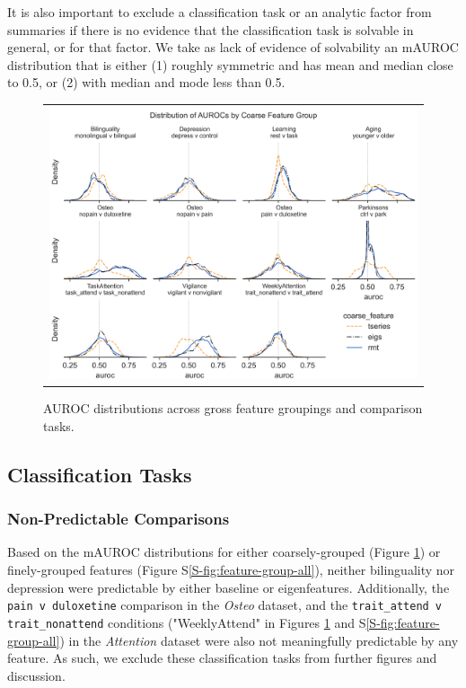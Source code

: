\documentclass[12pt]{spieman}  %
\newcommand{\code}[1]{\small \texttt{#1} \normalsize}
\begin{document}
\begin{spacing}{2}
It is also important to exclude a classification task or an analytic factor
from summaries if there is no evidence that the classification task is solvable
in general, or for that factor. We take as lack of evidence of solvability an
mAUROC distribution that is either (1) roughly symmetric and has mean and
median close to 0.5, or (2) with median and mode less than 0.5.

\begin{figure}
\begin{center}
\begin{tabular}{c}
\includegraphics[width=6.5in]{coarse_feature_overall_by_subgroup.png}
\end{tabular}
\end{center}
\caption
{ \label{fig:main-results}
AUROC distributions across gross feature groupings and comparison tasks.}
\end{figure}

\subsection{Classification Tasks}

\subsubsection{Non-Predictable Comparisons}
Based on the mAUROC distributions for either coarsely-grouped (Figure
\ref{fig:main-results}) or finely-grouped features (Figure
S\ref{S-fig:feature-group-all}), neither bilinguality nor depression were
predictable by either baseline or eigenfeatures. Additionally, the \code{pain v
duloxetine} comparison in the \textit{Osteo} dataset, and the
\code{trait\_attend v trait\_nonattend} conditions ("WeeklyAttend" in Figures
\ref{fig:main-results} and S\ref{S-fig:feature-group-all}) in the \textit{Attention}
dataset were also not meaningfully predictable by any feature. As such, we exclude
these classification tasks from further figures and discussion.


\end{spacing}
\end{document}
